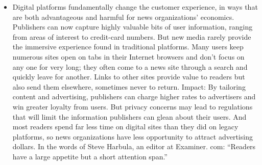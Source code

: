 \begin{itemize}
\item Digital platforms fundamentally change the customer experience, in
ways that are both advantageous and harmful for news organizations’
economics. Publishers can now capture highly valuable bits of user information,
ranging from areas of interest to credit-card numbers. But new media
rarely provide the immersive experience found in traditional platforms.
Many users keep numerous sites open on tabs in their Internet browsers and
don’t focus on any one for very long; they often come to a news site through
a search and quickly leave for another. Links to other sites provide value to
readers but also send them elsewhere, sometimes never to return.
Impact: By tailoring content and advertising, publishers can charge higher
rates to advertisers and win greater loyalty from users. But privacy concerns
may lead to regulations that will limit the information publishers can glean
about their users. And most readers spend far less time on digital sites than
they did on legacy platforms, so news organizations have less opportunity to
attract advertising dollars. In the words of Steve Harbula, an editor at Examiner.
com: ``Readers have a large appetite but a short attention span.''
\end{itemize}
